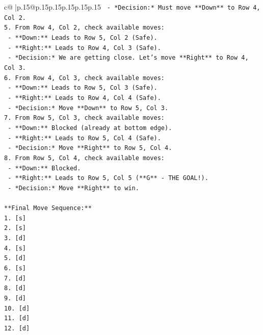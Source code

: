 \documentclass{article}
\begin{document}
{\begin{supertabular}{c@{$\;$}|p{.15\linewidth}@{}p{.15\linewidth}p{.15\linewidth}p{.15\linewidth}p{.15\linewidth}p{.15\linewidth}}
{{{\texttt{    {-}   *Decision:* Must move **Down** to Row 4, Col 2.} \\
\texttt{5.  From Row 4, Col 2, check available moves:} \\
\texttt{    {-}   **Down:** Leads to Row 5, Col 2 (Safe).} \\
\texttt{    {-}   **Right:** Leads to Row 4, Col 3 (Safe).} \\
\texttt{    {-}   *Decision:* We are getting close. Let's move **Right** to Row 4, Col 3.} \\
\texttt{6.  From Row 4, Col 3, check available moves:} \\
\texttt{    {-}   **Down:** Leads to Row 5, Col 3 (Safe).} \\
\texttt{    {-}   **Right:** Leads to Row 4, Col 4 (Safe).} \\
\texttt{    {-}   *Decision:* Move **Down** to Row 5, Col 3.} \\
\texttt{7.  From Row 5, Col 3, check available moves:} \\
\texttt{    {-}   **Down:** Blocked (already at bottom edge).} \\
\texttt{    {-}   **Right:** Leads to Row 5, Col 4 (Safe).} \\
\texttt{    {-}   *Decision:* Move **Right** to Row 5, Col 4.} \\
\texttt{8.  From Row 5, Col 4, check available moves:} \\
\texttt{    {-}   **Down:** Blocked.} \\
\texttt{    {-}   **Right:** Leads to Row 5, Col 5 (**G** {-} THE GOAL!).} \\
\texttt{    {-}   *Decision:* Move **Right** to win.} \\
\\ 
\texttt{**Final Move Sequence:**} \\
\texttt{1.  {[}s{]}} \\
\texttt{2.  {[}s{]}} \\
\texttt{3.  {[}d{]}} \\
\texttt{4.  {[}s{]}} \\
\texttt{5.  {[}d{]}} \\
\texttt{6.  {[}s{]}} \\
\texttt{7.  {[}d{]}} \\
\texttt{8.  {[}d{]}} \\
\texttt{9.  {[}d{]}} \\
\texttt{10. {[}d{]}} \\
\texttt{11. {[}d{]}} \\
\texttt{12. {[}d{]}} \\
}}}
\end{supertabular}}
\end{document}
